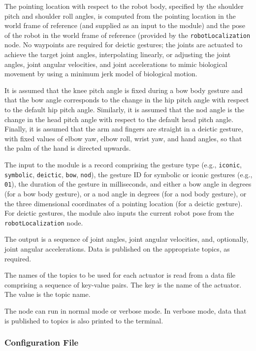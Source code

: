 \documentclass{CSSRforAfrica}
\begin{document}
{The pointing location  with respect to the robot body, specified by the shoulder pitch and shoulder roll angles, is computed from the pointing location in the world frame of reference (and supplied as an input to the module) and the pose of the robot in the world frame of reference (provided by the {\small \verb+robotLocalization+} node.   
No waypoints are required for deictic gestures; the joints are actuated to achieve the target joint angles, interpolating linearly, or adjusting the joint angles, joint angular velocities, and joint accelerations to mimic biological movement by using a minimum jerk model of biological motion. 

It is assumed that the knee pitch angle is fixed during a bow body gesture and that the bow angle corresponds to the change in the hip pitch angle with respect to the default hip pitch angle.   Similarly, it is assumed that the nod angle is the change in the head pitch angle with respect to the default head pitch angle.  Finally, it is assumed that the arm and fingers are  straight in a deictic gesture, with fixed values of elbow yaw, elbow roll,  wrist yaw, and hand angles, so that the palm of the hand is directed upwards.
 
The input to the module is a record comprising  the gesture type (e.g., {\small \verb+iconic+}, {\small \verb+symbolic+}, {\small \verb+deictic+}, {\small \verb+bow+}, {\small \verb+nod+}), the gesture ID for symbolic or iconic gestures (e.g., {\small \verb+01+}), the duration of the gesture in milliseconds, and either  a bow angle in degrees (for a bow body gesture), or a nod angle in degrees (for  a nod body gesture), or  the  three dimensional coordinates of a pointing location (for a deictic gesture).  For deictic gestures, the module also inputs the current robot pose from the {\small \verb+robotLocalization+} node. 

The output is a sequence of joint angles, joint angular velocities, and, optionally, joint angular accelerations. Data is published on the appropriate topics, as required.
 
The names of the topics to be used for each actuator is read from a data file comprising a sequence of key-value pairs. The key is the name of the actuator. The value is the topic name.    

The node can run in normal mode or verbose mode. In verbose mode, data that is published to topics is also printed to the terminal.


\subsubsection*{Configuration File}

}
\end{document}
